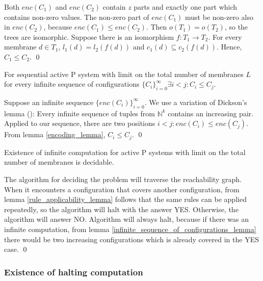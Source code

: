 \begin{dokaz}
  Both $enc(C_1)$ and $enc(C_2)$ contain $z$ parts and exactly one part which contains non-zero values. The non-zero part of $enc(C_1)$ must be non-zero also in $enc(C_2)$, because $enc(C_1)\leq enc(C_2)$. Then $o(T_1)=o(T_2)$, so the trees are isomorphic. Suppose there is an isomorphism $f:T_1\rightarrow T_2$. For every membrane $d\in T_1$, $l_1(d)=l_2(f(d))$ and $c_1(d)\subseteq c_2(f(d))$. Hence, $C_1\leq C_2$.
  \qed
\end{dokaz}

\begin{lemma}
\label{infinite_sequence_of_configurations_lemma}
  For sequential active P system with limit on the total number of membranes $L$ for every infinite sequence of configurations $\{C_i\}_{i=0}^\infty\exists i<j: C_i\leq C_j$.
\end{lemma}

\begin{dokaz}
  Suppose an infinite sequence $\{enc(C_i)\}_{i=0}^\infty$. We use a variation of Dickson's lemma (\cite{Figueira11Dickson}): Every infinite sequence of tuples from $\mathbb N^k$ contains an increasing pair. Applied to our sequence, there are two positions $i<j: enc(C_i)\leq enc(C_j)$. From lemma \ref{encoding_lemma}, $C_i\leq C_j$.
  \qed
\end{dokaz}

\begin{veta}
  Existence of infinite computation for active P systems with limit on the total number of membranes is decidable.
\end{veta}

\begin{dokaz}
  The algorithm for deciding the problem will traverse the reachability graph. When it encounters a configuration that covers another configuration, from lemma \ref{rule_applicability_lemma} follows that the same rules can be applied repeatedly, so the algorithm will halt with the answer YES.
  Otherwise, the algorithm will answer NO.
  Algorithm will always halt, because if there was an infinite computation, from lemma \ref{infinite_sequence_of_configurations_lemma} there would be two increasing configurations which is already covered in the YES case.
  \qed
\end{dokaz}


\subsubsection{Existence of halting computation} %
\label{ssub:existence_of_halting_computation}

